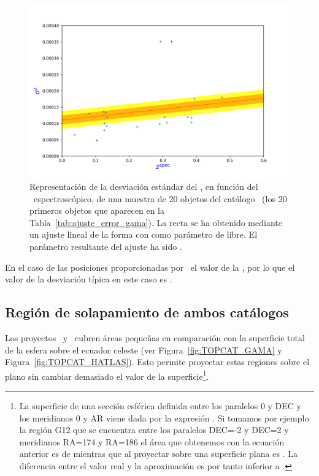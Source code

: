 \begin{figure}[htb]
    \begin{center}
         \includegraphics[width=14cm]{2_Muestras/ajuste_errores_z.png}
    \end{center}
    \vspace*{-10mm}
    \caption{\small Representación de la desviación estándar del \rt,  en función del \rt\ espectroscópico,  de una muestra de 20 objetos del catálogo \gama\ (los 20 primeros objetos que aparecen en la Tabla~\ref{tab:ajuste_error_gama}). La recta se ha obtenido mediante un ajuste lineal de la forma  con  como parámetro de libre. El parámetro resultante del ajuste ha sido .
    \label{fig:ajuste_error_gama}}
\end{figure}

En el caso de las posiciones proporcionadas por \gama\ el valor de la , por lo que el valor de la desviación típica en este caso es  \citep{article:driver_2009,article:driver_2008}.

\subsection{Región de solapamiento de ambos catálogos}

Los proyectos \gama\ y \hatlas\ cubren  áreas pequeñas en comparación con la superficie total de la esfera sobre el ecuador celeste (ver Figura~\ref{fig:TOPCAT_GAMA} y Figura~\ref{fig:TOPCAT_HATLAS}). Esto permite proyectar estas regiones sobre el plano sin cambiar demasiado el valor de la superficie\footnote{La superficie de una sección esférica definida entre los paralelos 0 y
DEC y los meridianos 0 y
AR viene dada por la expresión . Si tomamos por ejemplo la región G12 que se encuentra entre los paralelos DEC=-2 y DEC=2 y meridianos RA=174 y RA=186 el área que obtenemos con la ecuación anterior es de  mientras que al proyectar sobre una superficie plana es . La diferencia entre el valor real y la aproximación es por tanto inferior a .}.

